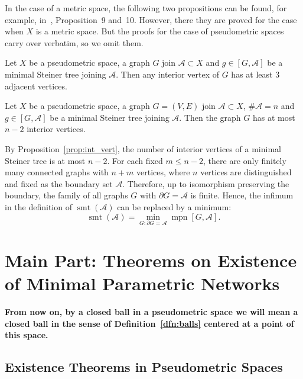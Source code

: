 \documentclass{svproc}
\def\mpn{\operatorname{mpn}}
\def\smt{\operatorname{smt}}
\begin{document}
In the case of a metric space, the following two propositions can be found, for example, in~\cite{Malaysia}, Proposition~9 and~10. However, there they are proved for the case when $X$ is a metric space. But the proofs for the case of pseudometric spaces carry over verbatim, so we omit them.

\begin{proposition}
Let $X$ be a pseudometric space, a graph $G$ join $\mathcal{A}\subset X$ and $g\in [G, \mathcal{A}]$ be a minimal Steiner tree joining $\mathcal{A}$. Then any interior vertex of $G$ has at least $3$ adjacent vertices.
\end{proposition}

\begin{proposition}\label{prop:int_vert}
Let $X$ be a pseudometric space, a graph $G = (V, E)$ join $\mathcal{A}\subset X$, $\# \mathcal{A} = n$ and $g\in [G, \mathcal{A}]$ be a minimal Steiner tree joining $\mathcal{A}$. Then the graph $G$ has at most $n-2$ interior vertices.
\end{proposition}

\begin{remark}\label{rk:finite_set}
By Proposition~\ref{prop:int_vert}, the number of interior vertices of a minimal Steiner tree is at most $n-2$. For each fixed $m \le n-2$, there are only finitely many connected graphs with $n+m$ vertices, where $n$ vertices are distinguished and fixed as the boundary set $\mathcal{A}$. Therefore, up to isomorphism preserving the boundary, the family of all graphs $G$ with $\partial G = \mathcal{A}$ is finite. Hence, the infimum in the definition of $\smt(\mathcal{A})$ can be replaced by a minimum:
$$\smt(\mathcal{A}) = \min_{G\colon \partial G = \mathcal{A}} \mpn[G, \mathcal{A}].$$
\end{remark}


%
\section{Main Part: Theorems on Existence of Minimal Parametric Networks}\label{Main}
%

\textbf{From now on, by a closed ball in a pseudometric space we will mean a closed ball in the sense of Definition~\ref{dfn:balls} centered at a point of this space.}

\subsection{Existence Theorems in Pseudometric Spaces}\label{sec:pseudo}
\end{document}
